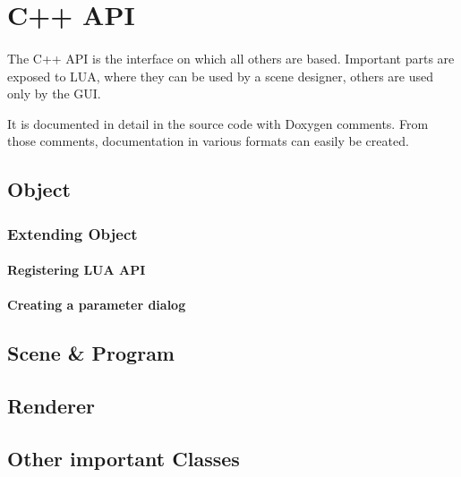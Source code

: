 \section{C++ API}
\paragraph{}
The C++ API is the interface on which all others are based.
Important parts are exposed to LUA, where they can be used by a scene designer, others are used only by the GUI.

It is documented in detail in the source code with Doxygen comments.
From those comments, documentation in various formats can easily be created.

\subsection{Object}
\paragraph{}


\subsubsection{Extending Object}
\paragraph{}


\paragraph{Registering LUA API}


\paragraph{Creating a parameter dialog}


\subsection{Scene \& Program}
\paragraph{}


\subsection{Renderer}
\paragraph{}


\subsection{Other important Classes}
\paragraph{}

